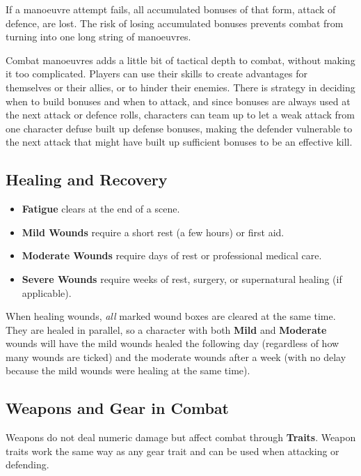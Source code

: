 \begin{multicols}{2}
If a manoeuvre attempt fails, all accumulated bonuses of that form, attack of defence, are lost. The risk of losing accumulated bonuses prevents combat from turning into one long string of manoeuvres.

Combat manoeuvres adds a little bit of tactical depth to combat, without making it too complicated. Players can use their skills to create advantages for themselves or their allies, or to hinder their enemies. There is strategy in deciding when to build bonuses and when to attack, and since bonuses are always used at the next attack or defence rolls, characters can team up to let a weak attack from one character defuse built up defense bonuses, making the defender vulnerable to the next attack that might have built up sufficient bonuses to be an effective kill.


\subsection{Healing and Recovery}\label{core:healing}

\begin{itemize}
    \item \textbf{Fatigue} clears at the end of a scene.
    \item \textbf{Mild Wounds} require a short rest (a few hours) or first aid.
    \item \textbf{Moderate Wounds} require days of rest or professional medical care.
    \item \textbf{Severe Wounds} require weeks of rest, surgery, or supernatural healing (if applicable).
\end{itemize}

When healing wounds, \emph{all} marked wound boxes are cleared at the same time. They are healed in parallel, so a character with both \textbf{Mild} and \textbf{Moderate} wounds will have the mild wounds healed the following day (regardless of how many wounds are ticked) and the moderate wounds after a week (with no delay because the mild wounds were healing at the same time).


\subsection{Weapons and Gear in Combat}
Weapons do not deal numeric damage but affect combat through \textbf{Traits}. Weapon traits work the same way as any gear trait and can be used when attacking or defending.


\end{multicols}
